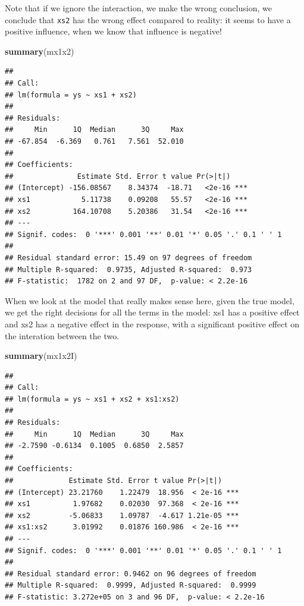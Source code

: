 \documentclass[
]{book}
\newenvironment{Shaded}{\begin{snugshade}}{\end{snugshade}}
\newcommand{\KeywordTok}[1]{\textcolor[rgb]{0.13,0.29,0.53}{\textbf{#1}}}
\newcommand{\NormalTok}[1]{#1}
\begin{document}
Note that if we ignore the interaction, we make the wrong conclusion, we conclude that \texttt{xs2} has the wrong effect compared to reality: it seems to have a positive influence, when we know that influence is negative!

\begin{Shaded}
\begin{Highlighting}[]
\KeywordTok{summary}\NormalTok{(mx1x2)}
\end{Highlighting}
\end{Shaded}

\begin{verbatim}
## 
## Call:
## lm(formula = ys ~ xs1 + xs2)
## 
## Residuals:
##     Min      1Q  Median      3Q     Max 
## -67.854  -6.369   0.761   7.561  52.010 
## 
## Coefficients:
##               Estimate Std. Error t value Pr(>|t|)    
## (Intercept) -156.08567    8.34374  -18.71   <2e-16 ***
## xs1            5.11738    0.09208   55.57   <2e-16 ***
## xs2          164.10708    5.20386   31.54   <2e-16 ***
## ---
## Signif. codes:  0 '***' 0.001 '**' 0.01 '*' 0.05 '.' 0.1 ' ' 1
## 
## Residual standard error: 15.49 on 97 degrees of freedom
## Multiple R-squared:  0.9735,	Adjusted R-squared:  0.973 
## F-statistic:  1782 on 2 and 97 DF,  p-value: < 2.2e-16
\end{verbatim}

When we look at the model that really makes sense here, given the true model, we get the right decisions for all the terms in the model: xs1 has a positive effect and xs2 has a negative effect in the response, with a significant positive effect on the interation between the two.

\begin{Shaded}
\begin{Highlighting}[]
\KeywordTok{summary}\NormalTok{(mx1x2I)}
\end{Highlighting}
\end{Shaded}

\begin{verbatim}
## 
## Call:
## lm(formula = ys ~ xs1 + xs2 + xs1:xs2)
## 
## Residuals:
##     Min      1Q  Median      3Q     Max 
## -2.7590 -0.6134  0.1005  0.6850  2.5857 
## 
## Coefficients:
##             Estimate Std. Error t value Pr(>|t|)    
## (Intercept) 23.21760    1.22479  18.956  < 2e-16 ***
## xs1          1.97682    0.02030  97.368  < 2e-16 ***
## xs2         -5.06833    1.09787  -4.617 1.21e-05 ***
## xs1:xs2      3.01992    0.01876 160.986  < 2e-16 ***
## ---
## Signif. codes:  0 '***' 0.001 '**' 0.01 '*' 0.05 '.' 0.1 ' ' 1
## 
## Residual standard error: 0.9462 on 96 degrees of freedom
## Multiple R-squared:  0.9999,	Adjusted R-squared:  0.9999 
## F-statistic: 3.272e+05 on 3 and 96 DF,  p-value: < 2.2e-16
\end{verbatim}
\end{document}
